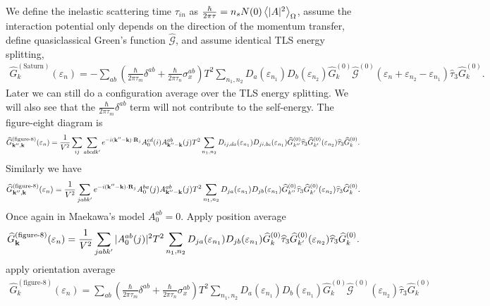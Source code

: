 \documentclass[]{article}
\begin{document}
We define the inelastic scattering time $\tau_{in}$ as $\frac{\hbar}{2\pi\tau}=n_sN(0)\ev{|A|^2}_\Omega$,
assume the interaction potential only depends on the direction of the momentum transfer,
define quasiclassical Green's function $\widehat{\mathcal{G}}$, and assume identical TLS energy splitting,
\begin{align}
    \widehat{G}^{(\text{Saturn})}_{k}(\varepsilon_n)
    = -\sum_{ab}
    \left(\frac{\hbar}{2\pi\tau_m}\delta^{ab} + \frac{\hbar}{2\pi\tau_n}\sigma_x^{ab}\right)
    T^2\sum_{n_1,n_2}
    D_a(\varepsilon_{n_1})D_b(\varepsilon_{n_2})
    \widehat{G}^{(0)}_k
    \widehat{\mathcal{G}}^{(0)}(\varepsilon_n+\varepsilon_{n_2}-\varepsilon_{n_1})
    \widehat{\tau}_3
    \widehat{G}^{(0)}_k.
\end{align}
Later we can still do a configuration average over the TLS energy splitting.
We will also see that the $\frac{\hbar}{2\pi\tau_m}\delta^{ab}$ term will not contribute to the self-energy.
The figure-eight diagram is
\begin{align}
    \widehat{G}^{(\text{figure-8})}_{\vb{k}'',\vb{k}}(\varepsilon_n)
    =\frac{1}{V^2}\sum_{ij}\sum_{abcdk'}
    e^{-i(\vb{k}''-\vb{k})\cdot\vb{R}_j}
    A_0^{cd}(i) A_{\vb{k}''-\vb{k}}^{ab}(j)
    T^2\sum_{n_1,n_2}
    D_{ij,da}(\varepsilon_{n_1})D_{ji,bc}(\varepsilon_{n_1})
    \widehat{G}^{(0)}_{k''}\widehat{\tau}_3
    \widehat{G}^{(0)}_{k'}(\varepsilon_{n_2})
    \widehat{\tau}_3
    \widehat{G}^{(0)}_k.
\end{align}
Similarly we have
\begin{align}
    \widehat{G}^{(\text{figure-8})}_{\vb{k}'',\vb{k}}(\varepsilon_n)
    =\frac{1}{V^2}\sum_{jabk'}
    e^{-i(\vb{k}''-\vb{k})\cdot\vb{R}_j}
    A_0^{ba}(j) A_{\vb{k}''-\vb{k}}^{ab}(j)
    T^2\sum_{n_1,n_2}
    D_{ja}(\varepsilon_{n_1})D_{jb}(\varepsilon_{n_1})
    \widehat{G}^{(0)}_{k''}\widehat{\tau}_3
    \widehat{G}^{(0)}_{k'}(\varepsilon_{n_2})
    \widehat{\tau}_3
    \widehat{G}^{(0)}_k.
\end{align}
Once again in Maekawa's model $A_0^{ab}=0$. Apply position average
\begin{align}
    \widehat{G}^{(\text{figure-8})}_{\vb{k}}(\varepsilon_n)
    =\frac{1}{V^2}\sum_{jabk'}
    |A_0^{ab}(j)|^2
    T^2\sum_{n_1,n_2}
    D_{ja}(\varepsilon_{n_1})D_{jb}(\varepsilon_{n_1})
    \widehat{G}^{(0)}_k\widehat{\tau}_3
    \widehat{G}^{(0)}_{k'}(\varepsilon_{n_2})
    \widehat{\tau}_3
    \widehat{G}^{(0)}_k.
\end{align}
apply orientation average
\begin{align}
    \widehat{G}^{(\text{figure-8})}_k(\varepsilon_n)
    =\sum_{ab}
    \left(\frac{\hbar}{2\pi\tau_m}\delta^{ab} + \frac{\hbar}{2\pi\tau_n}\sigma_x^{ab}\right)
    T^2\sum_{n_1,n_2}
    D_a(\varepsilon_{n_1})D_b(\varepsilon_{n_1})
    \widehat{G}^{(0)}_k
    \widehat{\mathcal{G}}^{(0)}(\varepsilon_{n_2})
    \widehat{\tau}_3
    \widehat{G}^{(0)}_k
\end{align}
\end{document}
